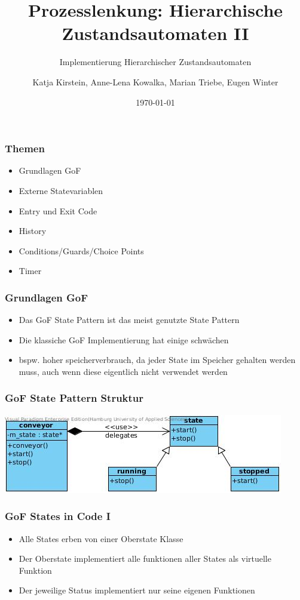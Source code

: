 \documentclass{beamer}
\title{Prozesslenkung: Hierarchische Zustandsautomaten II}
\subtitle{Implementierung Hierarchischer Zustandsautomaten}
\author{Katja Kirstein, Anne-Lena Kowalka, Marian Triebe, Eugen Winter}
\date{\today}
\begin{document}
\begin{frame}
\titlepage
\end{frame}

\begin{frame}
 \frametitle{Themen}
 \begin{itemize}
  \item Grundlagen GoF
  \item Externe Statevariablen
  \item Entry und Exit Code
  \item History
  \item Conditions/Guards/Choice Points
  \item Timer
 \end{itemize}
\end{frame}

\begin{frame}
 \frametitle{Grundlagen GoF}
 \begin{itemize}
  \item Das GoF State Pattern ist das meist genutzte State Pattern
  \item Die klassiche GoF Implementierung hat einige schw\"achen
  \item bspw. hoher speicherverbrauch, da jeder State im Speicher gehalten werden muss, auch wenn diese eigentlich nicht verwendet werden
 \end{itemize}
\end{frame}

\begin{frame}
 \frametitle{GoF State Pattern Struktur}
 \includegraphics[scale=.6]{img/fsm_gof.jpg}
\end{frame}

\begin{frame}
 \frametitle{GoF States in Code I}
 \begin{itemize}
  \item Alle States erben von einer Oberstate Klasse
  \item Der Oberstate implementiert alle funktionen aller States als virtuelle Funktion
  \item Der jeweilige Status implementiert nur seine eigenen Funktionen
 \end{itemize}
\end{frame}
\end{document}
